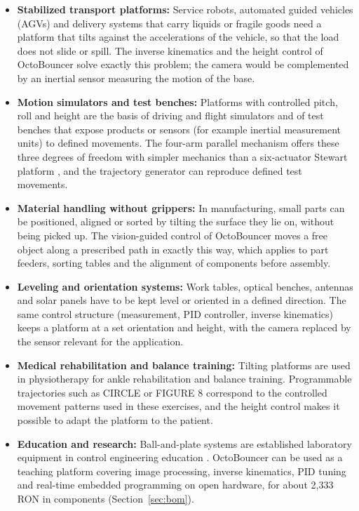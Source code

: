 \documentclass[12pt,a4paper]{report}
\begin{document}
\begin{itemize}
    \item \textbf{Stabilized transport platforms:} Service robots, automated guided vehicles (AGVs) and delivery systems that carry liquids or fragile goods need a platform that tilts against the accelerations of the vehicle, so that the load does not slide or spill. The inverse kinematics and the height control of OctoBouncer solve exactly this problem; the camera would be complemented by an inertial sensor measuring the motion of the base.
    \item \textbf{Motion simulators and test benches:} Platforms with controlled pitch, roll and height are the basis of driving and flight simulators and of test benches that expose products or sensors (for example inertial measurement units) to defined movements. The four-arm parallel mechanism offers these three degrees of freedom with simpler mechanics than a six-actuator Stewart platform \cite{ik_stewart}, and the trajectory generator can reproduce defined test movements.
    \item \textbf{Material handling without grippers:} In manufacturing, small parts can be positioned, aligned or sorted by tilting the surface they lie on, without being picked up. The vision-guided control of OctoBouncer moves a free object along a prescribed path in exactly this way, which applies to part feeders, sorting tables and the alignment of components before assembly.
    \item \textbf{Leveling and orientation systems:} Work tables, optical benches, antennas and solar panels have to be kept level or oriented in a defined direction. The same control structure (measurement, PID controller, inverse kinematics) keeps a platform at a set orientation and height, with the camera replaced by the sensor relevant for the application.
    \item \textbf{Medical rehabilitation and balance training:} Tilting platforms are used in physiotherapy for ankle rehabilitation and balance training. Programmable trajectories such as CIRCLE or FIGURE 8 correspond to the controlled movement patterns used in these exercises, and the height control makes it possible to adapt the platform to the patient.
    \item \textbf{Education and research:} Ball-and-plate systems are established laboratory equipment in control engineering education \cite{ball_plate_model}. OctoBouncer can be used as a teaching platform covering image processing, inverse kinematics, PID tuning and real-time embedded programming on open hardware, for about 2,333\,RON in components (Section~\ref{sec:bom}).
\end{itemize}
\end{document}
